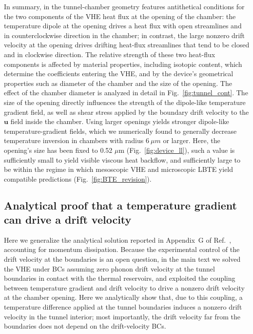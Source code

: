 \documentclass[
prb,
twocolumn,
superscriptaddress,
 amsmath,amssymb,
 aps,
longbibliography,
]{revtex4-2}
\begin{document}
In summary, in the tunnel-chamber geometry features antithetical conditions for the two components of the VHE heat flux at the opening of the chamber: the temperature dipole at the opening drives a heat flux with open streamlines and in counterclockwise direction in the chamber; in contrast, the large nonzero drift velocity at the opening drives drifting heat-flux streamlines that tend to be closed and in clockwise direction.
The relative strength of these two heat-flux components is affected by material properties, including isotopic content, which determine the coefficients entering the VHE, and by the device's geometrical properties such as diameter of the chamber and the size of the opening.
The effect of the chamber diameter is analyzed in detail in Fig.~\ref{fig:tunnel_cont}. The size of the opening directly influences the strength of the dipole-like temperature gradient field, as well as shear stress applied by the boundary drift velocity to the $\bm{u}$ field inside the chamber. Using larger openings yields stronger dipole-like temperature-gradient fields, which we numerically found to generally decrease temperature inversion in chambers with radius $6~\mu m$ or larger. Here, the opening's size has been fixed to 0.52 $\mu$m (Fig.~\ref{fig:device_ll}), such a value is sufficiently small to yield visible viscous heat backflow, and sufficiently large to be within the regime in which mesoscopic VHE and microscopic LBTE yield compatible predictions (Fig.~\ref{fig:BTE_revision}).

\subsection{Analytical proof that a temperature gradient can drive a drift velocity}
\label{subs:BCS_independence}
Here we generalize the analytical solution reported in Appendix~G of Ref.~\cite{Simoncelli2020}, accounting for momentum dissipation.
Because the experimental control of the drift velocity at the boundaries is an open question, in the main text we solved the VHE under BCs assuming zero phonon drift velocity at the tunnel boundaries in contact with the thermal reservoirs, and exploited the coupling between temperature gradient and drift velocity to drive a nonzero drift velocity at the chamber opening. Here we analytically show that, due to this coupling, a temperature difference applied at the tunnel boundaries induces a nonzero drift velocity in the tunnel interior; most importantly, the drift velocity far from the boundaries does not depend on the drift-velocity BCs.
\end{document}
